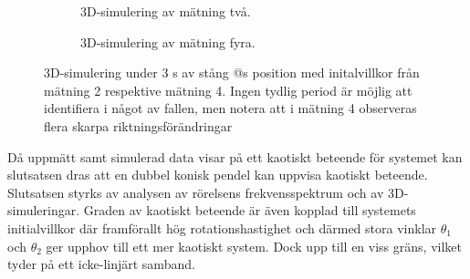 \documentclass[12pt,a4paper]{article}
\makeatletter
\newlength\fheight
\newcommand*{\rom}[1]{\expandafter\@slowromancap\romannumeral #1@}
\makeatother
\begin{document}
\begin{figure}[H]
    \vspace{-20px}
    \centering
    \begin{subfigure}[b]{0.49\textwidth}
        \centering
        \setlength\fheight{1.4in}
        
        \caption{3D-simulering av mätning två.}
    \end{subfigure}
    \hfill
    \begin{subfigure}[b]{0.49\textwidth}
        \centering
        \setlength\fheight{1.4in}
        
        \caption{3D-simulering av mätning fyra.}
    \end{subfigure}
    \caption{3D-simulering under 3 s av stång \rom{2}s position med initalvillkor från mätning 2 respektive mätning 4. Ingen tydlig period är möjlig att identifiera i något av fallen, men notera att i mätning 4 observeras flera skarpa riktningsförändringar}
    \label{resultat:xuppgf4}
\end{figure}



\vspace{-1px}
Då uppmätt samt simulerad data visar på ett kaotiskt beteende för systemet kan slutsatsen dras att en dubbel konisk pendel kan uppvisa kaotiskt beteende. Slutsatsen styrks av analysen av rörelsens frekvensspektrum och av 3D-simuleringar. Graden av kaotiskt beteende är även kopplad till systemets initialvillkor där framförallt hög rotationshastighet och därmed stora vinklar $\theta_1$ och $\theta_2$ ger upphov till ett mer kaotiskt system. Dock upp till en viss gräns, vilket tyder på ett icke-linjärt samband. 


%
\end{document}
